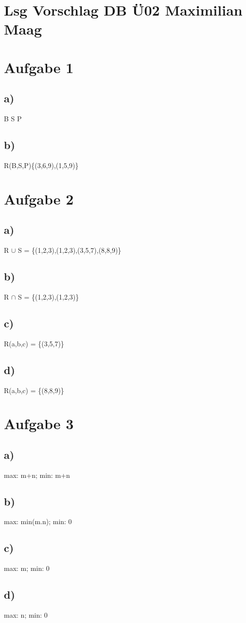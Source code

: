\documentclass{article}
\begin{document}
	\section*{Lsg Vorschlag DB Ü02 Maximilian Maag}
	\section*{Aufgabe 1}
	\subsection*{a)}
	B S P 
	\subsection*{b)}
	R(B,S,P)\{(3,6,9),(1,5,9)\}
	\section*{Aufgabe 2}
	\subsection*{a)}
	R $\cup$ S = \{(1,2,3),(1,2,3),(3,5,7),(8,8,9)\}
	\subsection*{b)}
	R $\cap$ S = \{(1,2,3),(1,2,3)\}
	\subsection*{c)}
	R(a,b,c) = \{(3,5,7)\}
	\subsection*{d)}
	R(a,b,c) = \{(8,8,9)\}
	\section*{Aufgabe 3}
	\subsection*{a)}
	max: m+n; min: m+n
	\subsection*{b)}
	max: min(m.n); min: 0
	\subsection*{c)}
	max: m; min: 0
	\subsection*{d)}
	max: n; min: 0
\end{document}
